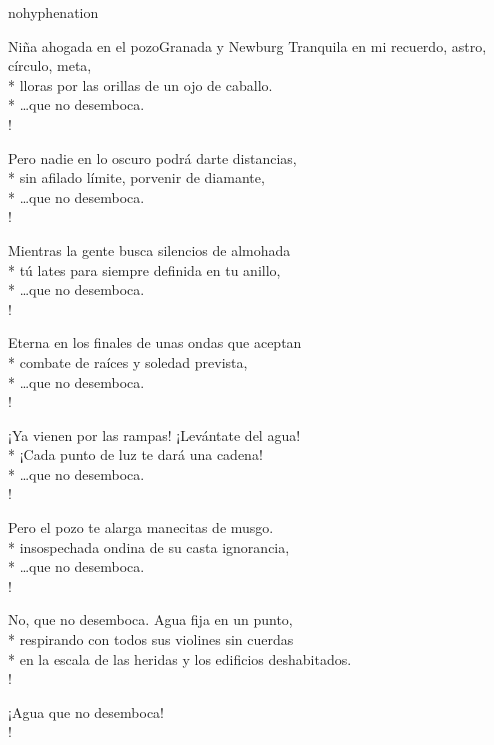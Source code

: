\documentclass[
    a5paper,
    DIV=10,
    12pt,
    notitlepage,
    oneside,]
{scrbook} %
\begin{document}
\begin{hyphenrules}{nohyphenation}
\begin{poem}{Niña ahogada en el pozo}{Granada y Newburg}{}
Tranquila en mi recuerdo, astro, círculo, meta,\\*
lloras por las orillas de un ojo de caballo.\\*
\ldots{}que no desemboca.\\!

Pero nadie en lo oscuro podrá darte distancias,\\*
sin afilado límite, porvenir de diamante,\\*
\ldots{}que no desemboca.\\!

Mientras la gente busca silencios de almohada\\*
tú lates para siempre definida en tu anillo,\\*
\ldots{}que no desemboca.\\!

Eterna en los finales de unas ondas que aceptan\\*
combate de raíces y soledad prevista,\\*
\ldots{}que no desemboca.\\!

¡Ya vienen por las rampas! ¡Levántate del agua!\\*
¡Cada punto de luz te dará una cadena!\\*
\ldots{}que no desemboca.\\!

Pero el pozo te alarga manecitas de musgo.\\*
insospechada ondina de su casta ignorancia,\\*
\ldots{}que no desemboca.\\!

No, que no desemboca. Agua fija en un punto,\\*
respirando con todos sus violines sin cuerdas\\*
en la escala de las heridas y los edificios deshabitados.\\!

¡Agua que no desemboca! \\!

\end{poem}


\end{hyphenrules}
\end{document}
